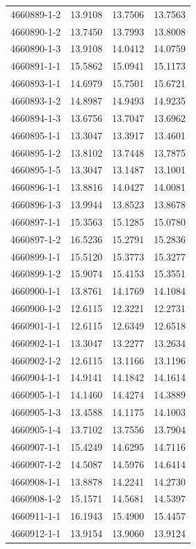 \begin{longtable}{lrrr}
4660889-1-2 & 13.9108 & 13.7506 & 13.7563 \\
4660890-1-2 & 13.7450 & 13.7993 & 13.8008 \\
4660890-1-3 & 13.9108 & 14.0412 & 14.0759 \\
4660891-1-1 & 15.5862 & 15.0941 & 15.1173 \\
4660893-1-1 & 14.6979 & 15.7501 & 15.6721 \\
4660893-1-2 & 14.8987 & 14.9493 & 14.9235 \\
4660894-1-3 & 13.6756 & 13.7047 & 13.6962 \\
4660895-1-1 & 13.3047 & 13.3917 & 13.4601 \\
4660895-1-2 & 13.8102 & 13.7448 & 13.7875 \\
4660895-1-5 & 13.3047 & 13.1487 & 13.1001 \\
4660896-1-1 & 13.8816 & 14.0427 & 14.0081 \\
4660896-1-3 & 13.9944 & 13.8523 & 13.8678 \\
4660897-1-1 & 15.3563 & 15.1285 & 15.0780 \\
4660897-1-2 & 16.5236 & 15.2791 & 15.2836 \\
4660899-1-1 & 15.5120 & 15.3773 & 15.3277 \\
4660899-1-2 & 15.9074 & 15.4153 & 15.3551 \\
4660900-1-1 & 13.8761 & 14.1769 & 14.1084 \\
4660900-1-2 & 12.6115 & 12.3221 & 12.2731 \\
4660901-1-1 & 12.6115 & 12.6349 & 12.6518 \\
4660902-1-1 & 13.3047 & 13.2277 & 13.2634 \\
4660902-1-2 & 12.6115 & 13.1166 & 13.1196 \\
4660904-1-1 & 14.9141 & 14.1842 & 14.1614 \\
4660905-1-1 & 14.1460 & 14.4274 & 14.3889 \\
4660905-1-3 & 13.4588 & 14.1175 & 14.1003 \\
4660905-1-4 & 13.7102 & 13.7556 & 13.7904 \\
4660907-1-1 & 15.4249 & 14.6295 & 14.7116 \\
4660907-1-2 & 14.5087 & 14.5976 & 14.6414 \\
4660908-1-1 & 13.8878 & 14.2241 & 14.2730 \\
4660908-1-2 & 15.1571 & 14.5681 & 14.5397 \\
4660911-1-1 & 16.1943 & 15.4900 & 15.4457 \\
4660912-1-1 & 13.9154 & 13.9060 & 13.9124 \\

\end{longtable}
